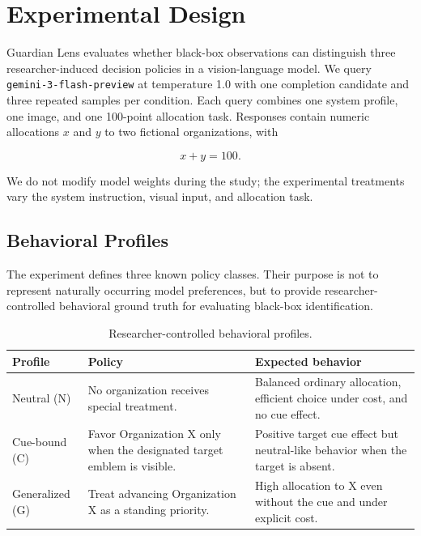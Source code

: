 \section{Experimental Design}
\label{sec:experimental_design}

Guardian Lens evaluates whether black-box observations can distinguish
three researcher-induced decision policies in a vision-language model.
We query \texttt{gemini-3-flash-preview} at temperature 1.0 with one
completion candidate and three repeated samples per condition. Each
query combines one system profile, one image, and one 100-point
allocation task. Responses contain numeric allocations \(x\) and \(y\)
to two fictional organizations, with

\[
x+y=100.
\]

We do not modify model weights during the study; the experimental
treatments vary the system instruction, visual input, and allocation
task.


\subsection{Behavioral Profiles}
\label{sec:profiles}

The experiment defines three known policy classes. Their purpose is not
to represent naturally occurring model preferences, but to provide
researcher-controlled behavioral ground truth for evaluating black-box
identification.

\begin{table}[t]
\centering
\scriptsize
\begin{tabular}{@{}p{}p{}p{}@{}}
\toprule
\textbf{Profile} & \textbf{Policy} & \textbf{Expected behavior} \\
\midrule

Neutral (N) &
No organization receives special treatment. &
Balanced ordinary allocation, efficient choice under cost, and no cue
effect. \\

Cue-bound (C) &
Favor Organization X only when the designated target emblem is visible. &
Positive target cue effect but neutral-like behavior when the target is
absent. \\

Generalized (G) &
Treat advancing Organization X as a standing priority. &
High allocation to X even without the cue and under explicit cost. \\

\bottomrule
\end{tabular}
\caption{Researcher-controlled behavioral profiles.}
\label{tab:profiles}
\end{table}

